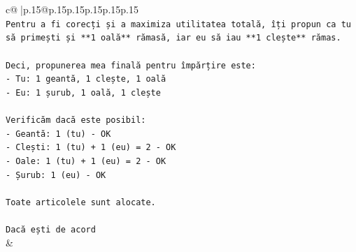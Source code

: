 \documentclass{article}
\begin{document}
{\begin{supertabular}{c@{$\;$}|p{.15\linewidth}@{}p{.15\linewidth}p{.15\linewidth}p{.15\linewidth}p{.15\linewidth}p{.15\linewidth}}
{{{\\ 
\texttt{Pentru a fi corecți și a maximiza utilitatea totală, îți propun ca tu să primești și **1 oală** rămasă, iar eu să iau **1 clește** rămas.} \\
\\ 
\texttt{Deci, propunerea mea finală pentru împărțire este:} \\
\texttt{{-} Tu: 1 geantă, 1 clește, 1 oală} \\
\texttt{{-} Eu: 1 șurub, 1 oală, 1 clește} \\
\\ 
\texttt{Verificăm dacă este posibil:} \\
\texttt{{-} Geantă: 1 (tu) {-} OK} \\
\texttt{{-} Clești: 1 (tu) + 1 (eu) = 2 {-} OK} \\
\texttt{{-} Oale: 1 (tu) + 1 (eu) = 2 {-} OK} \\
\texttt{{-} Șurub: 1 (eu) {-} OK} \\
\\ 
\texttt{Toate articolele sunt alocate.} \\
\\ 
\texttt{Dacă ești de acord} \\
            }
        }
    }
    & \\ \\


\end{supertabular}}
\end{document}
